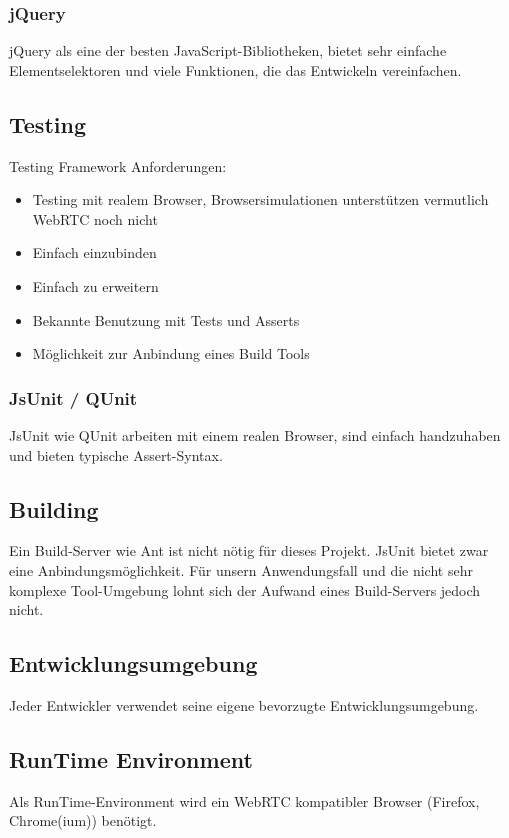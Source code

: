 \subsubsection{jQuery}
jQuery als eine der besten JavaScript-Bibliotheken, bietet sehr einfache
Elementselektoren und viele Funktionen, die das Entwickeln vereinfachen.


\subsection{Testing}
Testing Framework Anforderungen:
\begin{itemize}
	\setlength{\itemsep}{-\parsep}
	\item Testing mit realem Browser, Browsersimulationen unterstützen vermutlich WebRTC noch nicht
	\item Einfach einzubinden
	\item Einfach zu erweitern
	\item Bekannte Benutzung mit Tests und Asserts
	\item Möglichkeit zur Anbindung eines Build Tools
\end{itemize}

\subsubsection{JsUnit / QUnit}
JsUnit wie QUnit arbeiten mit einem realen Browser, sind einfach handzuhaben und bieten typische Assert-Syntax.



\subsection{Building}
Ein Build-Server wie Ant ist nicht nötig für dieses Projekt. JsUnit bietet zwar
eine Anbindungsmöglichkeit. Für unsern Anwendungsfall und die nicht sehr
komplexe Tool-Umgebung lohnt sich der Aufwand eines Build-Servers jedoch nicht.


\subsection{Entwicklungsumgebung}
Jeder Entwickler verwendet seine eigene bevorzugte Entwicklungsumgebung.


\subsection{RunTime Environment}
Als RunTime-Environment wird ein WebRTC kompatibler Browser (Firefox,
Chrome(ium)) benötigt.



